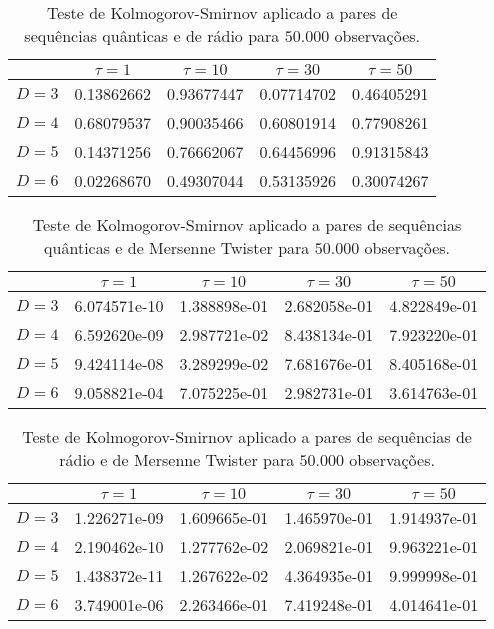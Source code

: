 \begin{table}[hbt]
	\centering
	\caption{Teste de Kolmogorov-Smirnov aplicado a pares de sequências quânticas e de rádio para $50.000$ observações.}\label{KS_Quantum_x_Radio_50k}
	\begin{tabular}{c | c | c | c | c}
		\toprule
		&    $\tau=1$   &   $\tau=10$   &   $\tau=30$   &   $\tau=50$   \\ \midrule
		$D=3$ & 0.13862662 & 0.93677447 & 0.07714702 &  0.46405291 \\
		$D=4$ & 0.68079537 & 0.90035466 & 0.60801914 &  0.77908261 \\
		$D=5$ & 0.14371256 & 0.76662067 & 0.64456996 &  0.91315843 \\
		$D=6$ & 0.02268670 & 0.49307044 & 0.53135926 &  0.30074267 \\
		\bottomrule
	\end{tabular}
\end{table}

\begin{table}[hbt]
	\centering
	\caption{Teste de Kolmogorov-Smirnov aplicado a pares de sequências quânticas e de Mersenne Twister para $50.000$ observações.}\label{KS_Quantum_x_MT_50k}
	\begin{tabular}{c | c | c | c | c}
		\toprule
		&    $\tau=1$   &   $\tau=10$   &   $\tau=30$   &   $\tau=50$   \\ \midrule
		$D=3$ & 6.074571e-10 & 1.388898e-01 & 2.682058e-01 & 4.822849e-01 \\
		$D=4$ & 6.592620e-09 & 2.987721e-02 & 8.438134e-01 & 7.923220e-01 \\
		$D=5$ & 9.424114e-08 & 3.289299e-02 & 7.681676e-01 & 8.405168e-01 \\
		$D=6$ & 9.058821e-04 & 7.075225e-01 & 2.982731e-01 & 3.614763e-01 \\
		\bottomrule
	\end{tabular}
\end{table}

\begin{table}[hbt]
	\centering
	\caption{Teste de Kolmogorov-Smirnov aplicado a pares de sequências de rádio e de Mersenne Twister para $50.000$ observações.}\label{KS_Radio_x_MT_50k}
	\begin{tabular}{c | c | c | c | c}
		\toprule
		&    $\tau=1$   &   $\tau=10$   &   $\tau=30$   &   $\tau=50$   \\ \midrule
		$D=3$ & 1.226271e-09 & 1.609665e-01 & 1.465970e-01 & 1.914937e-01 \\
		$D=4$ & 2.190462e-10 & 1.277762e-02 & 2.069821e-01 & 9.963221e-01 \\
		$D=5$ & 1.438372e-11 & 1.267622e-02 & 4.364935e-01 & 9.999998e-01 \\
		$D=6$ & 3.749001e-06 & 2.263466e-01 & 7.419248e-01 & 4.014641e-01 \\
		\bottomrule
	\end{tabular}
\end{table}

